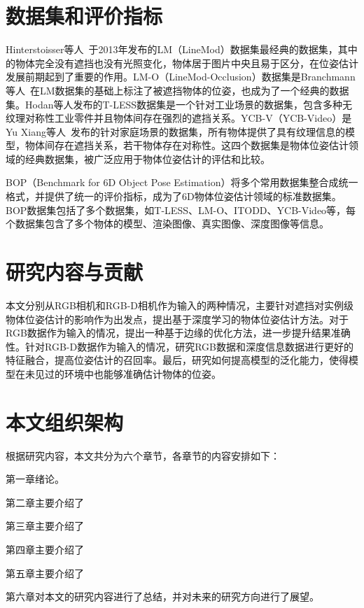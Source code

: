 \section{数据集和评价指标}
\par Hinterstoisser等人~\cite{lm}于2013年发布的LM（LineMod）数据集最经典的数据集，其中的物体完全没有遮挡也没有光照变化，物体居于图片中央且易于区分，在位姿估计发展前期起到了重要的作用。LM-O（LineMod-Occlusion）数据集是Branchmann等人~\cite{lmo}在LM数据集的基础上标注了被遮挡物体的位姿，也成为了一个经典的数据集。Hodan等人\cite{tless}发布的T-LESS数据集是一个针对工业场景的数据集，包含多种无纹理对称性工业零件并且物体间存在强烈的遮挡关系。YCB-V（YCB-Video）是Yu Xiang等人~\cite{ycbv}发布的针对家庭场景的数据集，所有物体提供了具有纹理信息的模型，物体间存在遮挡关系，若干物体存在对称性。这四个数据集是物体位姿估计领域的经典数据集，被广泛应用于物体位姿估计的评估和比较。
\par BOP（Benchmark for 6D Object Pose Estimation）\cite{hodan2018bop}将多个常用数据集整合成统一格式，并提供了统一的评价指标，成为了6D物体位姿估计领域的标准数据集。BOP数据集包括了多个数据集，如T-LESS、LM-O、ITODD、YCB-Video等，每个数据集包含了多个物体的模型、渲染图像、真实图像、深度图像等信息。
\section {研究内容与贡献}
\par 本文分别从RGB相机和RGB-D相机作为输入的两种情况，主要针对遮挡对实例级物体位姿估计的影响作为出发点，提出基于深度学习的物体位姿估计方法。对于RGB数据作为输入的情况，提出一种基于边缘的优化方法，进一步提升结果准确性。针对RGB-D数据作为输入的情况，研究RGB数据和深度信息数据进行更好的特征融合，提高位姿估计的召回率。最后，研究如何提高模型的泛化能力，使得模型在未见过的环境中也能够准确估计物体的位姿。
\section{本文组织架构}
\par 根据研究内容，本文共分为六个章节，各章节的内容安排如下：
\par 第一章绪论。
\par 第二章主要介绍了
\par 第三章主要介绍了
\par 第四章主要介绍了
\par 第五章主要介绍了
\par 第六章对本文的研究内容进行了总结，并对未来的研究方向进行了展望。


